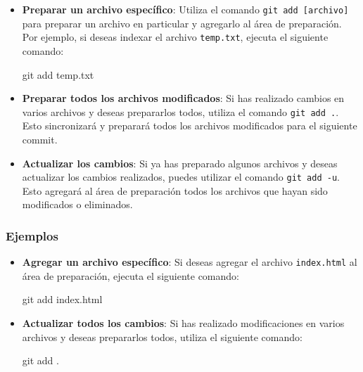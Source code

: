 \documentclass[
  letterpaper,
  DIV=11,
  numbers=noendperiod]{scrartcl}
\newenvironment{Shaded}{}{}
\newcommand{\FunctionTok}[1]{\textcolor[rgb]{0.44,0.26,0.76}{#1}}
\newcommand{\NormalTok}[1]{\textcolor[rgb]{0.14,0.16,0.18}{#1}}
\begin{document}
\begin{itemize}
\item
  \textbf{Preparar un archivo específico}: Utiliza el comando
  \texttt{git\ add\ {[}archivo{]}} para preparar un archivo en
  particular y agregarlo al área de preparación. Por ejemplo, si deseas
  indexar el archivo \texttt{temp.txt}, ejecuta el siguiente comando:

\begin{Shaded}
\begin{Highlighting}[]
\FunctionTok{git}\NormalTok{ add temp.txt}
\end{Highlighting}
\end{Shaded}
\item
  \textbf{Preparar todos los archivos modificados}: Si has realizado
  cambios en varios archivos y deseas prepararlos todos, utiliza el
  comando \texttt{git\ add\ .}. Esto sincronizará y preparará todos los
  archivos modificados para el siguiente commit.
\item
  \textbf{Actualizar los cambios}: Si ya has preparado algunos archivos
  y deseas actualizar los cambios realizados, puedes utilizar el comando
  \texttt{git\ add\ -u}. Esto agregará al área de preparación todos los
  archivos que hayan sido modificados o eliminados.
\end{itemize}

\hypertarget{ejemplos-1}{%
\subsubsection{Ejemplos}\label{ejemplos-1}}

\begin{itemize}
\item
  \textbf{Agregar un archivo específico}: Si deseas agregar el archivo
  \texttt{index.html} al área de preparación, ejecuta el siguiente
  comando:

\begin{Shaded}
\begin{Highlighting}[]
\FunctionTok{git}\NormalTok{ add index.html}
\end{Highlighting}
\end{Shaded}
\item
  \textbf{Actualizar todos los cambios}: Si has realizado modificaciones
  en varios archivos y deseas prepararlos todos, utiliza el siguiente
  comando:

\begin{Shaded}
\begin{Highlighting}[]
\FunctionTok{git}\NormalTok{ add .}
\end{Highlighting}
\end{Shaded}
\end{itemize}
\end{document}
